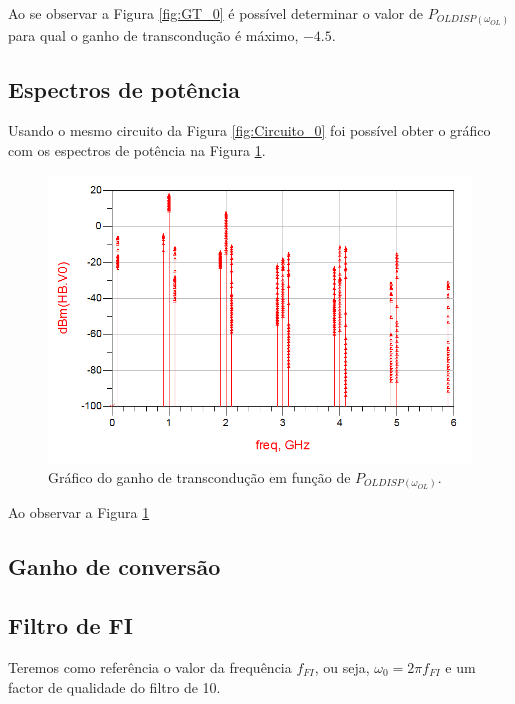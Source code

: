 \documentclass[11pt]{article}
\numberwithin{equation}{section}
\begin{document}
Ao se observar a Figura \ref{fig:GT_0} é possível determinar o valor de $ P_{OLDISP(\omega_{OL})} $ para qual o ganho de transcondução é máximo, $ -4.5 $.

\subsection{Espectros de potência}

Usando o mesmo circuito da Figura \ref{fig:Circuito_0} foi possível obter o gráfico com os espectros de potência na Figura \ref{fig:EP_0}.

\begin{figure}[H]
	\centering
	\includegraphics[keepaspectratio=true, scale=0.45]{exps/EP_0}
	\vspace{-0.5em}
	\caption{Gráfico do ganho de transcondução em função de $ P_{OLDISP(\omega_{OL})} $.}
	\vspace{-0.8em}
	\label{fig:EP_0}
\end{figure}

Ao observar a Figura \ref{fig:EP_0} 


\subsection{Ganho de conversão}


\subsection{Filtro de FI}
 
Teremos como referência o valor da frequência $ f_{FI} $, ou seja, $ \omega_{0}=2\pi f_{FI} $ e um factor de qualidade do filtro de 10. 
\end{document}
